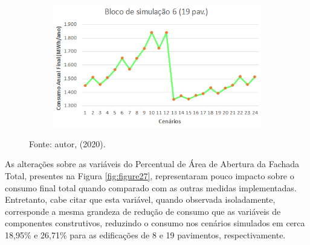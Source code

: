 \begin{figure}[H]
\begin{subfigure}[b]{0.49\textwidth}
    \end{subfigure}
    \begin{subfigure}[b]{0.49\textwidth}
        \includegraphics[width=\textwidth]{figures/result/fig32-bloco6.png}
    \end{subfigure}
    \begin{flushleft}
        \par \small Fonte: autor, (2020).
    \end{flushleft}
    \label{fig:figure26}
\end{figure}
\noindent As alterações sobre as variáveis do Percentual de Área de Abertura da Fachada Total, presentes na Figura \ref{fig:figure27}, representaram pouco impacto sobre o consumo final total quando comparado com as outras medidas implementadas. Entretanto, cabe citar que esta variável, quando observada isoladamente, corresponde a mesma grandeza de redução de consumo que as variáveis de componentes construtivos, reduzindo o consumo nos cenários simulados em cerca 18,95\% e 26,71\% para as edificações de 8 e 19 pavimentos, respectivamente. 
